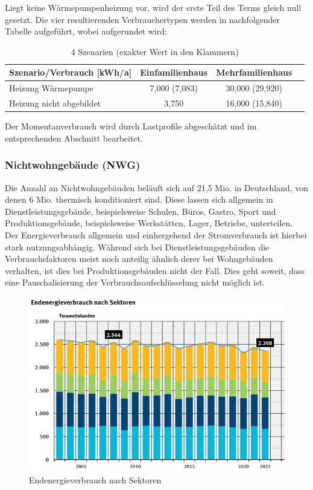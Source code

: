 Liegt keine Wärmepumpenheizung vor, wird der erste Teil des Terms gleich null gesetzt. 
Die vier resultierenden Verbrauchertypen werden in nachfolgender Tabelle aufgeführt, wobei aufgerundet wird:

\begin{table}[htbp]
    \centering
    \caption{4 Szenarien (exakter Wert in den Klammern)}
    \label{tab:szenarien}
    \begin{tabular}{lccc}
        \toprule
        \textbf{Szenario/Verbrauch [kWh/a]} & \textbf{Einfamilienhaus} & \textbf{Mehrfamilienhaus} \\
        \midrule
        Heizung Wärmepumpe & 7,000 (7,083) & 30,000 (29,920) \\
        Heizung nicht abgebildet & 3,750 & 16,000 (15,840) \\
        \bottomrule
    \end{tabular}
\end{table}

Der Momentanverbrauch wird durch Lastprofile abgeschätzt und im entsprechenden Abschnitt bearbeitet.

\subsubsection{Nichtwohngebäude (NWG)}

Die Anzahl an Nichtwohngebäuden beläuft sich auf 21,5 Mio. in Deutschland, von denen 6 Mio. thermisch konditioniert sind. 
Diese lassen sich allgemein in Dienstleistungsgebäude, beispielsweise Schulen, Büros, Gastro, Sport und Produktionsgebäude, beispielsweise Werkstätten, Lager, Betriebe, unterteilen. 
Der Energieverbrauch allgemein und einhergehend der Stromverbrauch ist hierbei stark nutzungsabhängig. 
Während sich bei Dienstleistungsgebäuden die Verbrauchsfaktoren meist noch anteilig ähnlich derer bei Wohngebäuden verhalten, ist dies bei Produktionsgebäuden nicht der Fall. 
Dies geht soweit, dass eine Pauschalisierung der Verbrauchsaufschlüsselung nicht möglich ist.

\begin{figure}[h!]
    \centering
    \includegraphics[width=14cm]{Abbildungen/VerbraucherAbb3.jpg}
    \caption{Endenergieverbrauch nach Sektoren}\label{fig:Endenergieverbrauch_nach_Sektoren}
\end{figure}

